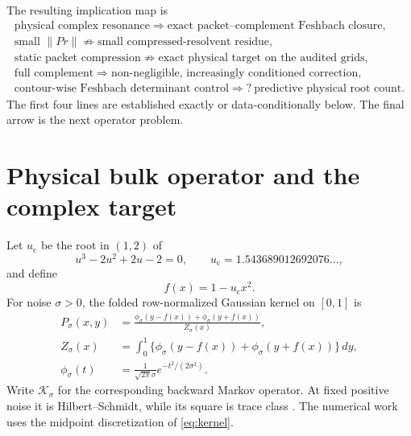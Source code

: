\documentclass[11pt]{article}
\theoremstyle{definition}
\theoremstyle{remark}
\newcommand{\uc}{u_{\mathrm c}}
\newcommand{\cK}{\mathcal K}
\begin{document}
The resulting implication map is
\begin{equation}
\label{eq:intro-map}
 \boxed{
 \begin{gathered}
 \text{physical complex resonance}
 \Longrightarrow
 \text{exact packet--complement Feshbach closure},\\
 \text{small }\|Pr\|
 \not\Longrightarrow
 \text{small compressed-resolvent residue},\\
 \text{static packet compression}
 \not\Longrightarrow
 \text{exact physical target on the audited grids},\\
 \text{full complement}
 \Longrightarrow
 \text{non-negligible, increasingly conditioned correction},\\
 \text{contour-wise Feshbach determinant control}
 \Longrightarrow?\
 \text{predictive physical root count}.
 \end{gathered}}
\end{equation}
The first four lines are established exactly or data-conditionally below.
The final arrow is the next operator problem.

\section{Physical bulk operator and the complex target}
\label{sec:physical-operator}

Let $\uc$ be the root in $(1,2)$ of
\begin{equation}
\label{eq:critical-parameter}
 u^3-2u^2+2u-2=0,
 \qquad
 \uc=1.543689012692076\ldots,
\end{equation}
and define
\begin{equation}
\label{eq:quadratic-map}
 f(x)=1-\uc x^2.
\end{equation}
For noise $\sigma>0$, the folded row-normalized Gaussian kernel on $[0,1]$
is
\begin{align}
 P_\sigma(x,y)
 &=\frac{\phi_\sigma(y-f(x))+\phi_\sigma(y+f(x))}{Z_\sigma(x)},
 \label{eq:kernel}\\
 Z_\sigma(x)
 &=\int_0^1\{\phi_\sigma(y-f(x))+\phi_\sigma(y+f(x))\}\,dy,
 \label{eq:normalizer}\\
 \phi_\sigma(t)&=\frac{1}{\sqrt{2\pi}\sigma}
 e^{-t^2/(2\sigma^2)}.
 \label{eq:normal-density}
\end{align}
Write $\cK_\sigma$ for the corresponding backward Markov operator.  At
fixed positive noise it is Hilbert--Schmidt, while its square is trace class
\citep{Baladi2000}.  The numerical work uses the midpoint discretization of
\eqref{eq:kernel}.
\end{document}
